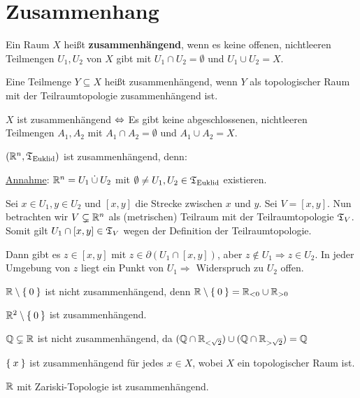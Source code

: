 \section{Zusammenhang}
\begin{definition}%
    \begin{defenum}
        \item Ein Raum $X$ heißt \textbf{zusammenhängend}, wenn es keine offenen,
              nichtleeren Teilmengen $U_1, U_2$ von $X$ gibt mit 
              $U_1 \cap U_2 = \emptyset$ und $U_1 \cup U_2 = X$.
        \item Eine Teilmenge $Y \subseteq X$ heißt zusammenhängend, wenn $Y$
              als topologischer Raum mit der Teilraumtopologie zusammenhängend ist.
    \end{defenum}
\end{definition}

\begin{bemerkung}
    $X$ ist zusammenhängend $\Leftrightarrow$ Es gibt keine abgeschlossenen,
    nichtleeren Teilmengen $A_1, A_2$ mit $A_1 \cap A_2 = \emptyset$ 
    und $A_1 \cup A_2 = X$.
\end{bemerkung}

\begin{beispiel}
    \begin{bspenum}
        \item $(\mathbb{R}^n, \mathfrak{T}_{\textnormal{Euklid}})$ ist zusammenhängend, denn:

            \underline{Annahme}: $\mathbb{R}^n = U_1 \mathbin{\dot{\cup}} U_2$ mit $\emptyset \neq U_1, U_2 \in \mathfrak{T}_{\textnormal{Euklid}}$ existieren.

            Sei $x \in U_1, y \in U_2$ und $[x,y]$ die Strecke zwischen $x$
            und $y$. Sei $V = [x,y]$. Nun betrachten wir $V \subsetneq \mathbb{R}^n$ als 
            (metrischen) Teilraum mit der Teilraumtopologie $\mathfrak{T}_V$.
            Somit gilt $U_1 \cap [x,y] \in \mathfrak{T}_V$ wegen der Definition der 
            Teilraumtopologie.

            Dann gibt es $z \in [x,y]$ mit $z \in \partial (U_1 \cap [x,y])$,
            aber $z \notin U_1 \Rightarrow z \in U_2$. In jeder Umgebung von 
            $z$ liegt ein Punkt von $U_1 \Rightarrow$ Widerspruch zu $U_2$ offen.
        \item $\mathbb{R} \setminus \Set{0}$ ist nicht zusammenhängend, denn
              $\mathbb{R} \setminus \Set{0} = \mathbb{R}_{< 0} \cup \mathbb{R}_{> 0}$
        \item $\mathbb{R}^2 \setminus \Set{0}$ ist zusammenhängend.
        \item $\mathbb{Q} \subsetneq \mathbb{R}$ ist nicht zusammenhängend, da 
              $(\mathbb{Q} \cap \mathbb{R}_{< \sqrt{2}}) \cup (\mathbb{Q} \cap \mathbb{R}_{> \sqrt{2}}) = \mathbb{Q}$
        \item $\Set{x}$ ist zusammenhängend für jedes $x \in X$, 
              wobei $X$ ein topologischer Raum ist.
        \item $\mathbb{R}$ mit Zariski-Topologie ist zusammenhängend.
    \end{bspenum}
\end{beispiel}

